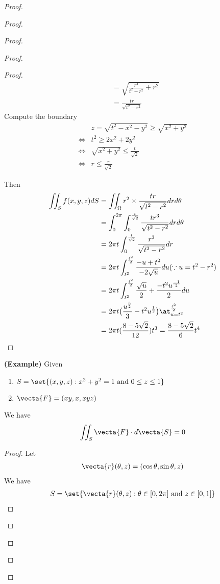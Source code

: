 \documentclass{report}
\begin{document}
\begin{proof}
\begin{proof}
\begin{proof}
\begin{proof}
\begin{proof}
\begin{align*}
                                            &=\sqrt{\frac{r^4}{t^2-r^2}+r^2}\\
                                            &=\frac{tr}{\sqrt{t^2-r^2} }
\end{align*}
Compute the boundary  
\begin{align*}
&z=\sqrt{t^2-x^2-y^2}\geq \sqrt{x^2+y^2}\\
  \iff & t^2\geq 2x^2+2y^2\\
\iff & \sqrt{x^2+y^2}\leq \frac{t}{\sqrt{2} }\\
\iff & r\leq \frac{r}{\sqrt{2} }
\end{align*}

Then 
\begin{align*}
  \iint_S f(x,y,z)dS&=\iint_{\Omega} r^2 \times \frac{tr}{\sqrt{ t^2-r^2}}drd\theta\\
&=\int_0^{2\pi}\int_0^{\frac{t}{\sqrt{2} }}\frac{tr^3}{\sqrt{t^2-r^2} }drd\theta\\
&=2\pi t \int_0^{\frac{t}{\sqrt{2} }}\frac{r^3}{\sqrt{t^2-r^2} }dr\\
&=2\pi t\int_{t^2}^{\frac{t^2}{2}}\frac{-u+t^2}{-2\sqrt{u} }du(\because u=t^2-r^2)\\
&=2\pi t \int_{t^2}^{\frac{t^2}{2}} \frac{\sqrt{u} }{2}+\frac{-t^2 u^{\frac{-1}{2}}}{2}du\\
&=2\pi t \big(\frac{u^{\frac{3}{2}}}{3}-t^2u^{\frac{1}{2}}\big)\at_{u=t^2}^{\frac{t^2}{2}}\\
&=2\pi t (\frac{8-5 \sqrt{2} }{12})t^3=\frac{8-5\sqrt{2} }{6}t^4
\end{align*}
\end{proof}
\begin{theorem}
\label{10.1.10}
\textbf{(Example)} Given 
\begin{enumerate}[label=(\alph*)]
  \item $S=\set{(x,y,z):x^2+y^2=1\text{ and }0\leq z\leq 1}$
  \item $\vecta{F}=(xy,x,xyz)$
\end{enumerate}
We have
\begin{align*}
\iint_S \vecta{F}\cdot d\vecta{S}=0
\end{align*}
\end{theorem}
\begin{proof}
Let 
\begin{align*}
\vecta{r}(\theta,z)=(\cos \theta,\sin \theta,z)
\end{align*}
We have 
\begin{align*}
S=\set{\vecta{r}(\theta,z):\theta \in [0,2\pi]\text{ and }z\in [0,1]}

\end{align*}
\end{proof}
\end{proof}
\end{proof}
\end{proof}
\end{proof}
\end{document}

